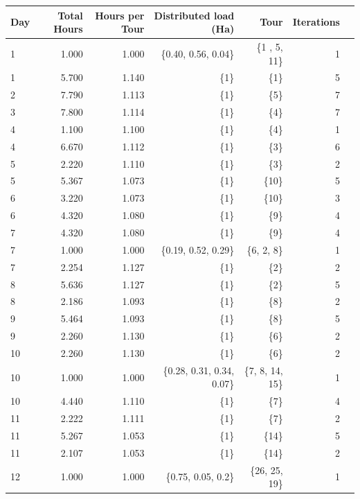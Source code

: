 \documentclass{amsart}
\begin{document}
        \begin{table}[!htp]\centering
            \scriptsize
            \begin{tabular}{lrrrrrr}\toprule
            \textbf{Day} &\textbf{Total Hours} &\textbf{Hours per Tour} &\textbf{Distributed load (Ha)} &\textbf{Tour} &\textbf{Iterations} \\\midrule
            1 &1.000 &1.000 & \{0.40, 0.56, 0.04\} &\{1 , 5, 11\} &1 \\
            1 &5.700 &1.140 & \{1\} & \{1\} &5 \\
            2 &7.790 &1.113 &\{1\} & \{5\} &7 \\
            3 &7.800 &1.114 &\{1\} &  \{4\} &7 \\
            4 &1.100 &1.100 &\{1\} &\{4\} &1 \\
            4 &6.670 &1.112 &\{1\} &\{3\} &6 \\
            5 &2.220 &1.110 &\{1\} &\{3\} &2 \\
            5 &5.367 &1.073 &\{1\} &\{10\} &5 \\
            6 &3.220 &1.073 &\{1\} &\{10\} &3 \\
            6 &4.320 &1.080 &\{1\} &\{9\} &4 \\
            7 &4.320 &1.080 &\{1\} &\{9\} &4 \\
            7 &1.000 &1.000 &\{0.19, 0.52, 0.29\} &\{6, 2, 8\} &1 \\
            7 &2.254 &1.127 &\{1\} &\{2\} &2 \\
            8 &5.636 &1.127 &\{1\} &\{2\} &5 \\
            8 &2.186 &1.093 &\{1\} &\{8\} &2 \\
            9 &5.464 &1.093 &\{1\} &\{8\} &5 \\
            9 &2.260 &1.130 &\{1\} &\{6\} &2 \\
            10 &2.260 &1.130 &\{1\} &\{6\} &2 \\
            10 &1.000 &1.000 &\{0.28, 0.31, 0.34, 0.07\} & \{7, 8, 14, 15\} &1 \\
            10 &4.440 &1.110 &\{1\} &\{7\} &4 \\
            11 &2.222 &1.111 &\{1\} &\{7\} &2 \\
            11 &5.267 &1.053 &\{1\} &\{14\} &5 \\
            11 &2.107 &1.053 &\{1\} &\{14\} &2 \\
            12 &1.000 &1.000 &\{0.75, 0.05, 0.2\} &\{26, 25, 19\} &1 \\

\end{tabular}
\end{table}
\end{document}
